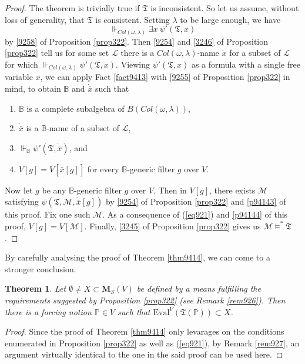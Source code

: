 \documentclass[12pt, twoside]{memoir}
\numberwithin{equation}{section}
\newtheorem{thm}{Theorem}[section]
\theoremstyle{definition}
\theoremstyle{remark}
\theoremstyle{definition}
\theoremstyle{definition}
\theoremstyle{definition}
\theoremstyle{remark}
\begin{document}
\begin{proof}
The theorem is trivially true if $\mathfrak{T}$ is inconsistent. So let us assume, without loss of generality, that $\mathfrak{T}$ is consistent. Setting $\lambda$ to be large enough, we have $$\Vdash_{Col(\omega, \lambda)} \exists x \ \psi'(\mathfrak{T}, x)$$ by \ref{9258} of Proposition \ref{prop322}. Then \ref{9254} and \ref{3246} of Proposition \ref{prop322} tell us for some set $\mathcal{L}$ there is a $Col(\omega, \lambda)$-name $\dot{x}$ for a subset of $\mathcal{L}$ for which $\Vdash_{Col(\omega, \lambda)} \psi'(\mathfrak{T}, \dot{x})$. Viewing $\psi'(\mathfrak{T}, x)$ as a formula with a single free variable $x$, we can apply Fact \ref{fact9413} with \ref{9255} of Proposition \ref{prop322} in mind, to obtain $\mathbb{B}$ and $\dot{\bar{x}}$ such that
\begin{enumerate}[label=(\arabic*)]
    \item $\mathbb{B}$ is a complete subalgebra of $B(Col(\omega, \lambda))$, 
    \item $\dot{\bar{x}}$ is a $\mathbb{B}$-name of a subset of $\mathcal{L}$, 
    \item\label{p94143} $\Vdash_{\mathbb{B}} \psi'(\mathfrak{T}, \dot{\bar{x}})$, and
    \item\label{p94144} $V[g] = V[\dot{\bar{x}}[g]]$ for every $\mathbb{B}$-generic filter $g$ over $V$.
\end{enumerate}
Now let $g$ be any $\mathbb{B}$-generic filter $g$ over $V$. Then in $V[g]$, there exists $\mathcal{M}$ satisfying $\psi(\mathfrak{T}, \mathcal{M}, \dot{\bar{x}}[g])$ by \ref{9254} of Proposition \ref{prop322} and \ref{p94143} of this proof. Fix one such $\mathcal{M}$. As a consequence of (\ref{eq921}) and \ref{p94144} of this proof, $V[g] = V[\mathcal{M}]$. Finally, \ref{3245} of Proposition \ref{prop322} gives us $\mathcal{M} \models^* \mathfrak{T}$.
\end{proof}

By carefully analysing the proof of Theorem \ref{thm9414}, we can come to a stronger conclusion. 

\begin{thm}\label{thm9415}
Let $\emptyset \neq X \subset \mathbf{M}_S(V)$ be defined by a means fulfilling the requirements suggested by Proposition \ref{prop322} (see Remark \ref{rem926}). Then there is a forcing notion $\mathbb{P} \in V$ such that $\mathrm{Eval}^V(\mathfrak{T}(\mathbb{P})) \subset X$. 
\end{thm}

\begin{proof}
Since the proof of Theorem \ref{thm9414} only levarages on the conditions enumerated in Proposition \ref{prop322} as well as (\ref{eq921}), by Remark \ref{rem927}, an argument virtually identical to the one in the said proof can be used here.
\end{proof}
\end{document}
